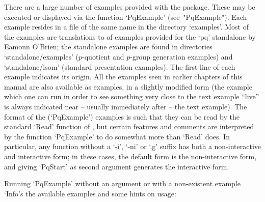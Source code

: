 

There are a large number of  examples provided with the {\ANUPQ} package. 
These  may  be  executed   or  displayed  via  the  function  `PqExample'
(see~"PqExample"). Each example resides in a file of the same name in the
directory `examples'. Most of the  examples are translations to {\GAP} of
examples  provided  for  the  `pq'  standalone  by  Eamonn  O'Brien;  the
standalone  examples  are   found  in  directories  `standalone/examples'
($p$-quotient  and $p$-group  generation examples)  and `standalone/isom'
(standard  presentation  examples).   The  first  line  of  each  example
indicates its origin.  All the examples seen in  earlier chapters of this
manual are also  available as examples, in a  slightly modified form (the
example which  one can run  in order to  see something very close  to the
text  example ``live'' is  always indicated  near --  usually immediately
after -- the  text example). The format of  the (`PqExample') examples is
such that they can be read by the standard `Read' function of {\GAP}, but
certain features and comments are interpreted by the function `PqExample'
to do somewhat more than `Read' does. In particular, any function without
a `-i', `-ni'  or `.g' suffix has both  a non-interactive and interactive
form; in these  cases, the default form is  the non-interactive form, and
giving `PqStart' as second argument generates the interactive form.

Running `PqExample' without an argument or with  a  non-existent  example
`Info's the available examples and some hints on usage:

